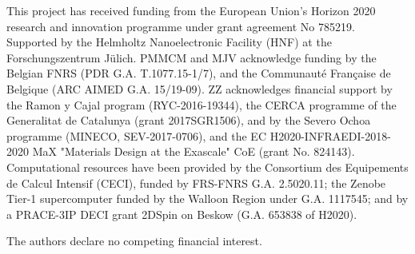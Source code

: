 \documentclass[prb,aps,superscriptaddress,reprint]{revtex4-1}
\begin{document}
\begin{acknowledgements} %
This project has received funding from the European Union's Horizon 2020 research and innovation programme under grant agreement No 785219. Supported by the Helmholtz Nanoelectronic Facility (HNF)\cite{HNF} at the Forschungszentrum J\"ulich.
%                   
PMMCM and MJV acknowledge funding by the Belgian FNRS (PDR G.A. T.1077.15-1/7), and the Communaut\'e Fran\c{c}aise de Belgique (ARC AIMED G.A. 15/19-09). 
%
ZZ acknowledges financial support by the Ramon y Cajal program (RYC-2016-19344), the CERCA programme of the Generalitat de Catalunya (grant 2017SGR1506), and by the Severo Ochoa programme (MINECO, SEV-2017-0706), and the EC 
H2020-INFRAEDI-2018-2020 MaX "Materials Design at the Exascale" CoE (grant No. 824143).
Computational resources have been provided by the Consortium des Equipements de Calcul Intensif (CECI), funded by FRS-FNRS G.A. 2.5020.11; the Zenobe Tier-1 supercomputer funded by the Walloon Region under G.A. 1117545; and by a PRACE-3IP DECI grant 2DSpin on Beskow (G.A. 653838 of H2020).
 

The authors declare no competing financial interest.
\end{acknowledgements}%


\end{document}
